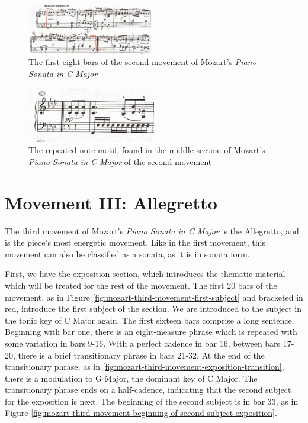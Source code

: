 \begin{figure}
    \centering
    \includegraphics[width=0.5\textwidth]{figures/mozart-second-movement-first-eight-bars.jpg}
    \caption{The first eight bars of the second movement of Mozart's \textit{Piano Sonata in C Major}}
    \label{fig:mozart-second-movement-first-eight-bars}
\end{figure}

\begin{figure}
    \centering
    \includegraphics[width=0.5\textwidth]{figures/mozart-second-movement-repeated-note-motif-middle-section.jpg}
    \caption{The repeated-note motif, found in the middle section of Mozart's \textit{Piano Sonata in C Major} of the second movement}
    \label{fig:mozart-second-movement-middle-section-motif}
\end{figure}

\section{Movement III: Allegretto}
The third movement of Mozart's \textit{Piano Sonata in C Major} is the Allegretto, and is the piece's most energetic movement. Like in the first movement, this movement can also be classified as a sonata, as it is in sonata form. 

First, we have the exposition section, which introduces the thematic material which will be treated for the rest of the movement. The first 20 bars of the movement, as in Figure \ref{fig:mozart-third-movement-first-subject}\autocite{Henle_1977} and bracketed in red, introduce the first subject of the section. We are introduced to the subject in the tonic key of C Major again. The first sixteen bars comprise a long sentence. Beginning with bar one, there is an eight-measure phrase which is repeated with some variation in bars 9-16. With a perfect cadence in bar 16, between bars 17-20, there is a brief transitionary phrase in bars 21-32. At the end of the transitionary phrase, as in \ref{fig:mozart-third-movement-exposition-transition}\autocite{Henle_1977}, there is a modulation to G Major, the dominant key of C Major. The transitionary phrase ends on a half-cadence, indicating that the second subject for the exposition is next. The beginning of the second subject is in bar 33, as in Figure \ref{fig:mozart-third-movement-beginning-of-second-subject-exposition}\autocite{Henle_1977}. 

